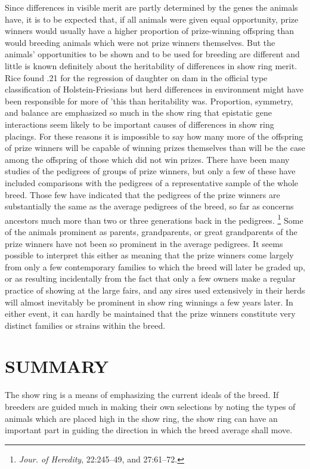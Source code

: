 Since differences in visible merit are partly determined by the genes
the animals have, it is to be expected that, if all animals were given
equal opportunity, prize winners would usually have a higher proportion
of prize-winning offspring than would breeding animals which
were not prize winners themselves. But the animals' opportunities to
be shown and to be used for breeding are different and little is known
definitely about the heritability of differences in show ring merit. Rice
found .21 for the regression of daughter on dam in the official type
classification of Holstein-Friesians but herd differences in environment
might have been responsible for more of 'this than heritability was.
Proportion, symmetry, and balance are emphasized so much in the
show ring that epistatic gene interactions seem likely to be important
causes of differences in show ring placings. For these reasons it is impossible
to say how many more of the offspring of prize winners will be
capable of winning prizes themselves than will be the case among the
offspring of those which did not win prizes. There have been many
studies of the pedigrees of groups of prize winners, but only a few of
these have included comparisons with the pedigrees of a representative
sample of the whole breed. Those few have indicated that the pedigrees
of the prize winners are substantially the same as the average
pedigrees of the breed, so far as concerns ancestors much more than
two or three generations back in the pedigrees.
\footnote{\textit{Jour. of Heredity}, 22:245--49, and 27:61--72.} Some of the animals
prominent as parents, grandparents, or great grandparents of the prize
winners have not been so prominent in the average pedigrees. It seems
possible to interpret this either as meaning that the prize winners come
largely from only a few contemporary families to which the breed will
later be graded up, or as resulting incidentally from the fact that only a
few owners make a regular practice of showing at the large fairs, and
any sires used extensively in their herds will almost inevitably be prominent
in show ring winnings a few years later. In either event, it can
hardly be maintained that the prize winners constitute very distinct
families or strains within the breed.

\section*{SUMMARY}

The show ring is a means of emphasizing the current ideals of the
breed. If breeders are guided much in making their own selections by
noting the types of animals which are placed high in the show ring, the
show ring can have an important part in guiding the direction in which
the breed average shall move.

